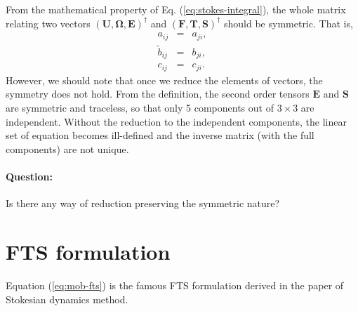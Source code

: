 \documentclass{book}
\begin{document}
From the mathematical property of Eq. (\ref{eq:stokes-integral}),
the whole matrix relating two vectors
$(\bm{U}, \bm{\Omega}, \bm{E})^\dagger$ and
$(\bm{F}, \bm{T}, \bm{S})^\dagger$
should be symmetric.
That is,
\begin{eqnarray}
  a_{ij} &=& a_{ji},\\
  \tilde{b}_{ij} &=& b_{ji},\\
  c_{ij} &=& c_{ji}.
\end{eqnarray}
However, we should note that
once we reduce the elements of vectors,
the symmetry does not hold.
From the definition, the second order tensors $\bm{E}$ and $\bm{S}$
are symmetric and traceless, so that only 5 components
out of $3\times 3$ are independent.
Without the reduction to the independent components,
the linear set of equation becomes ill-defined
and the inverse matrix (with the full components) are not unique.

\paragraph{Question:}
Is there any way of reduction
preserving the symmetric nature?


\section{FTS formulation}
Equation (\ref{eq:mob-fts}) is the famous FTS formulation
derived in the paper of Stokesian dynamics method\cite{DurlofskyEtal1987}.
\end{document}
